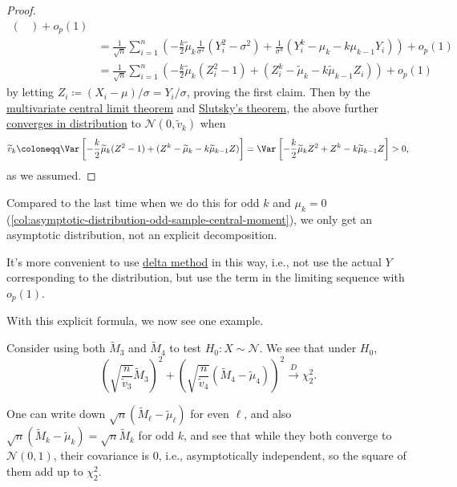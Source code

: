 \begin{proof}
\[\begin{split}
\begin{pmatrix}
			                                                                    \end{pmatrix} + o_p(1)                                                                                             \\
			 & = \frac{1}{\sqrt{n} } \sum_{i=1}^{n} \left( -\frac{k}{2} \widetilde{\mu} _k \frac{1}{\sigma ^2} (Y_i^2 - \sigma ^2) + \frac{1}{\sigma ^k} (Y_i^k - \mu _k - k \mu _{k-1} Y_i) \right) + o_p(1) \\
			 & = \frac{1}{\sqrt{n} } \sum_{i=1}^{n} \left( -\frac{k}{2} \widetilde{\mu} _k (Z_i^2 - 1) + (Z_i^k - \widetilde{\mu} _k - k \widetilde{\mu} _{k-1} Z_i ) \right) + o_p(1)
		\end{split}
	\]
	by letting \(Z_i \coloneqq (X_i - \mu) / \sigma = Y_i / \sigma \), proving the first claim. Then by the \hyperref[thm:multivariate-CLT]{multivariate central limit theorem} and \hyperref[col:Slutsky]{Slutsky's theorem}, the above further \hyperref[def:converge-in-distribution]{converges in distribution} to \(\mathcal{N} (0, \widetilde{v} _k)\) when
	\[
		\widetilde{v} _k
		\coloneqq \Var_{}\left[-\frac{k}{2} \widetilde{\mu} _k (Z^2 - 1) + (Z^k - \widetilde{\mu} _k - k \widetilde{\mu} _{k-1} Z ) \right]
		= \Var_{}\left[-\frac{k}{2} \widetilde{\mu} _k Z^2 + Z^k - k \widetilde{\mu} _{k-1} Z \right] > 0,
	\]
	as we assumed.
\end{proof}

Compared to the last time  when we do this for odd \(k\) and \(\mu _k = 0\) (\autoref{col:asymptotic-distribution-odd-sample-central-moment}), we only get an asymptotic distribution, not an explicit decomposition.

\begin{note}
	It's more convenient to use \hyperref[thm:delta-method]{delta method} in this way, i.e., not use the actual \(Y\) corresponding to the distribution, but use the term in the limiting sequence with \(o_p(1)\).
\end{note}

With this explicit formula, we now see one example.

\begin{eg}
	Consider using both \(\widetilde{M} _3\) and \(\widetilde{M} _4\) to test \(H_0\colon X \sim \mathcal{N} \). We see that under \(H_0\),
	\[
		\left( \sqrt{\frac{n}{\widetilde{v} _3}} \widetilde{M} _3 \right) ^2 + \left( \sqrt{\frac{n}{\widetilde{v} _4}} (\widetilde{M} _4 - \widetilde{\mu} _4) \right) ^2
		\overset{D}{\to} \chi _2^2 .
	\]
\end{eg}
\begin{explanation}
	One can write down \(\sqrt{n} (\widetilde{M} _\ell - \widetilde{\mu} _\ell )\) for even \(\ell \), and also \(\sqrt{n} (\widetilde{M} _k - \widetilde{\mu} _k)= \sqrt{n} \widetilde{M} _k\) for odd \(k\), and see that while they both converge to \(\mathcal{N} (0, 1)\), their covariance is \(0\), i.e., asymptotically independent, so the square of them add up to \(\chi _2^2\).
\end{explanation}

